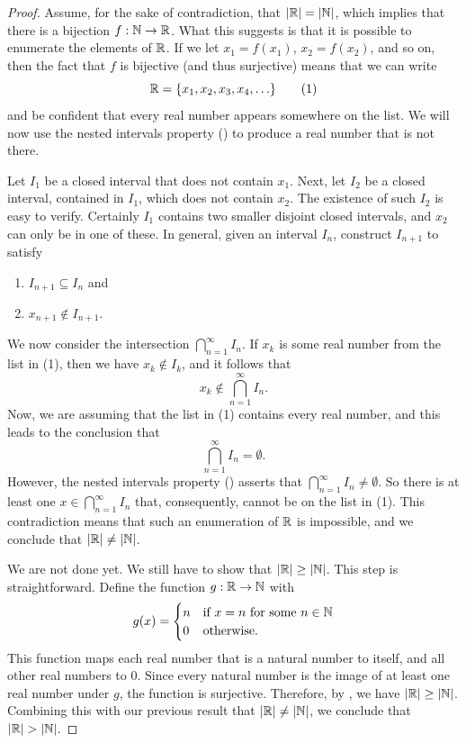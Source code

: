 \documentclass[11pt,twoside=off,numbers=noenddot]{scrbook}
\begin{document}
\begin{proof}
  Assume, for the sake of contradiction, that $| \mathbb R | =
  | \mathbb N |$, which implies that there is a bijection $f : \mathbb N \to
  \mathbb R$. What this suggests is that it is possible to enumerate the
  elements of $\mathbb R$. If we let $x_1 = f(x_1)$, $x_2 = f(x_2)$, and so
  on, then the fact that $f$ is bijective (and thus surjective) means
  that we can write
  \[ \RR = \set{x_1, x_2, x_3, x_4, \dots} \tag{1} \]
  and be confident that every real number appears somewhere on the
  list. We will now use the nested intervals property
  () to produce a real number that
  is not there.

  Let $I_1$ be a closed interval that does not contain $x_1$. Next,
  let $I_2$ be a closed interval, contained in $I_1$, which does not
  contain $x_2$. The existence of such $I_2$ is easy to verify.
  Certainly $I_1$ contains two smaller disjoint closed intervals, and
  $x_2$ can only be in one of these. In general, given an interval
  $I_n$, construct $I_{n + 1}$ to satisfy
  \begin{enumerate}
    \item $I_{n + 1} \subseteq I_n$ and
    \item $x_{n + 1} \notin I_{n + 1}$.
  \end{enumerate}
  We now consider the intersection $\bigcap_{n = 1}^{\infty} I_n$. If
  $x_k$ is some real number from the list in (1), then we have $x_k
  \notin I_k$, and it follows that
  \[ x_k \notin \bigcap_{n = 1}^{\infty} I_n. \]
  Now, we are assuming that the list in (1) contains every real
  number, and this leads to the conclusion that
  \[ \bigcap_{n = 1}^{\infty} I_n = \emptyset. \]
  However, the nested intervals property
  () asserts that $\bigcap_{n =
  1}^{\infty} I_n \neq \emptyset$. So there is at least one $x \in
  \bigcap_{n = 1}^{\infty} I_n$ that, consequently, cannot be on the
  list in (1). This contradiction means that such an enumeration of
  $\mathbb R$ is impossible, and we conclude that $| \mathbb R | \neq | \mathbb N |$.

  We are not done yet. We still have to show that $| \mathbb R | \geq
  | \mathbb N |$. This step is straightforward. Define the function $g :
  \mathbb R \to \mathbb N$ with
  \begin{align*}
    g(x) =
    \begin{cases}
      n & \text{if $x = n$ for some $n \in \mathbb N$} \\
      0 & \text{otherwise}.
    \end{cases}
  \end{align*}
  This function maps each real number that is a natural number to
  itself, and all other real numbers to 0. Since every natural number
  is the image of at least one real number under $g$, the function is
  surjective. Therefore, by , we have
  $| \mathbb R | \geq | \mathbb N |$. Combining this with our previous
  result that $| \mathbb R | \neq | \mathbb N |$, we conclude that
  $| \mathbb R | > | \mathbb N |$.
\end{proof}
\end{document}
